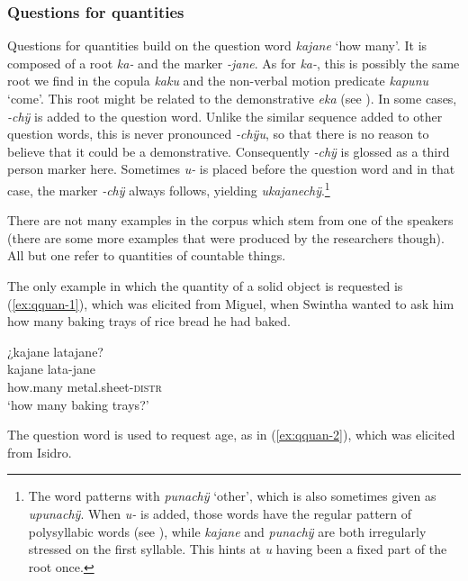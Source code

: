 \subsubsection{Questions for quantities}\label{sec:Q_kajane}

Questions for quantities build on the question word \textit{kajane} ‘how many’. It is composed of a root \textit{ka-} and the  marker \textit{-jane}. As for \textit{ka-}, this is possibly the same root we find in the copula \textit{kaku} and the non-verbal motion predicate \textit{kapunu} ‘come’. This root might be related to the demonstrative \textit{eka} (see ). In some cases, \textit{-chÿ} is added to the question word. Unlike the similar sequence added to other question words, this is never pronounced \textit{-chÿu}, so that there is no reason to believe that it could be a demonstrative. Consequently \textit{-chÿ} is glossed as a third person marker here.
Sometimes \textit{u-} is placed before the question word and in that case, the marker \textit{-chÿ} always follows, yielding \textit{ukajanechÿ}.\footnote{The word patterns with \textit{punachÿ} ‘other’, which is also sometimes given as \textit{upunachÿ}. When \textit{u-} is added, those words have the regular  pattern of polysyllabic words (see ), while \textit{kajane} and \textit{punachÿ} are both irregularly stressed on the first syllable. This hints at \textit{u} having been a fixed part of the root once.}

There are not many examples in the corpus which stem from one of the speakers (there are some more examples that were produced by the researchers though). All but one refer to quantities of countable things.

The only example in which the quantity of a solid object is requested is (\ref{ex:qquan-1}), which was elicited from Miguel, when Swintha wanted to ask him how many baking trays of rice bread he had baked.

\ea\label{ex:qquan-1}
\begingl
\glpreamble ¿kajane latajane?\\
\gla kajane lata-jane\\
\glb how.many metal.sheet-\textsc{distr}\\
\glft ‘how many baking trays?’
\endgl
\trailingcitation{[mxx-e120415ls.093]}
\xe

The question word is used to request age, as in (\ref{ex:qquan-2}), which was elicited from Isidro.

